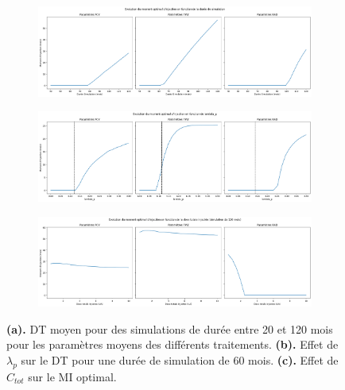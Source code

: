 \documentclass[12pt,a4paper]{article}
\begin{document}
\begin{figure}

    \centering
    \begin{subfigure}[t]{\textwidth}
        \centering
        \includegraphics[width=\textwidth]{Image/duree_simu.png} 
        \caption{} \label{fig:duree_simu}
    \end{subfigure}

    \vspace{0.5cm}

    \begin{subfigure}[t]{\textwidth}
        \centering
        \includegraphics[width=\textwidth]{Image/effet_lambda_moment.png}
        \caption{} \label{fig:effet_lambda_moment}
    \end{subfigure}

    \vspace{0.5cm}

    \begin{subfigure}[t]{\textwidth}
        \centering
        \includegraphics[width=\textwidth]{Image/effet_ctot_moment.png}
        \caption{} \label{fig:effet_ctot_moment}
    \end{subfigure}

    \caption{\textbf{(a).} \ac{DT} moyen pour des simulations de durée entre 20 et 120 mois pour les paramètres moyens des différents traitements. \textbf{(b).} Effet de $\lambda_{p}$ sur le \ac{DT} pour une durée de simulation de 60 mois. \textbf{(c).} Effet de $C_{tot}$ sur le \ac{MI} optimal.}
\end{figure}
\end{document}
